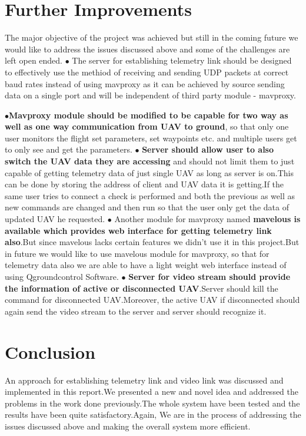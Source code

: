 \documentclass[12pt]{article}
\begin{document}
\section{Further Improvements}
The major objective of the project was achieved but still in the coming future we would like to address the issues discussed above and some of the challenges are left open ended.\newline 
\subitem $\bullet$ The server for establishing telemetry link should be designed to effectively use the methiod of receiving and sending UDP packets at correct baud rates instead of using mavproxy as it can be achieved by source sending data on a single port and will be independent of third party module - mavproxy. \newline

\subitem $\bullet${\bf Mavproxy module should be modified to be capable for two way as well as one way communication from UAV to ground}, so that only one user monitors the flight set parameters, set waypoints etc. and multiple users get to only see and get the parameters.\newline
\subitem $\bullet$ {\bf Server should allow user to also switch the UAV data they are accessing} and should not limit them to just capable of getting telemetry data of just single UAV as long as server is on.This can be done by storing the address of client and UAV data it is getting.If the same user tries to connect a check is performed and both the previous as well as new commands are changed and then run so that the user only get the data of updated UAV he requested.\newline
\subitem $\bullet$ Another module for mavproxy named {\bf mavelous \cite{8} is available which provides web interface for getting telemetry link also}.But since mavelous lacks certain features we didn't use it in this project.But in future we would like to use mavelous module for mavproxy, so that for telemetry data also we are able to have a light weight web interface instead of using Qgroundcontrol Software.\newline
\subitem $\bullet$ {\bf Server for video stream should  provide the information of active or disconnected UAV}.Server should kill the command for disconnected UAV.Moreover, the active UAV if disconnected should again send the video stream to the server and server should recognize it.\newline

\section{Conclusion}
An approach for establishing telemetry link and video link was discussed and implemented in this report.We presented a new and novel idea and addressed the problems in the work done previously.The whole system have been tested and the results have been quite satisfactory.Again, We are in the process of addressing the issues discussed above and making the overall system more efficient.
\end{document}
